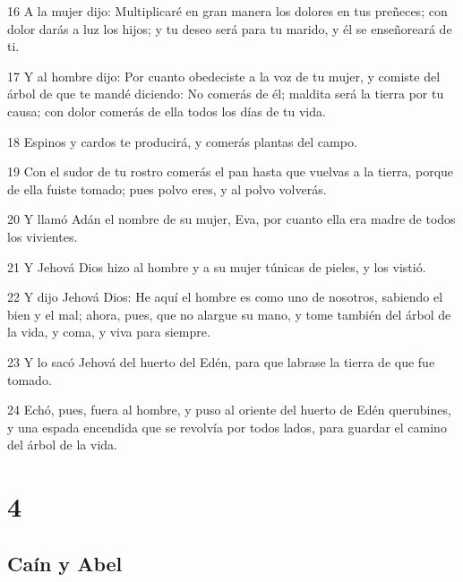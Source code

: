 \par 16 A la mujer dijo: Multiplicaré en gran manera los dolores en tus preñeces; con dolor darás a luz los hijos; y tu deseo será para tu marido, y él se enseñoreará de ti.
\par 17 Y al hombre dijo: Por cuanto obedeciste a la voz de tu mujer, y comiste del árbol de que te mandé diciendo: No comerás de él; maldita será la tierra por tu causa; con dolor comerás de ella todos los días de tu vida.
\par 18 Espinos y cardos te producirá, y comerás plantas del campo.
\par 19 Con el sudor de tu rostro comerás el pan hasta que vuelvas a la tierra, porque de ella fuiste tomado; pues polvo eres, y al polvo volverás.
\par 20 Y llamó Adán el nombre de su mujer, Eva, por cuanto ella era madre de todos los vivientes.
\par 21 Y Jehová Dios hizo al hombre y a su mujer túnicas de pieles, y los vistió.
\par 22 Y dijo Jehová Dios: He aquí el hombre es como uno de nosotros, sabiendo el bien y el mal; ahora, pues, que no alargue su mano, y tome también del árbol de la vida, y coma, y viva para siempre.
\par 23 Y lo sacó Jehová del huerto del Edén, para que labrase la tierra de que fue tomado.
\par 24 Echó, pues, fuera al hombre, y puso al oriente del huerto de Edén querubines, y una espada encendida que se revolvía por todos lados, para guardar el camino del árbol de la vida.

\chapter{4}

\section*{Caín y Abel}

